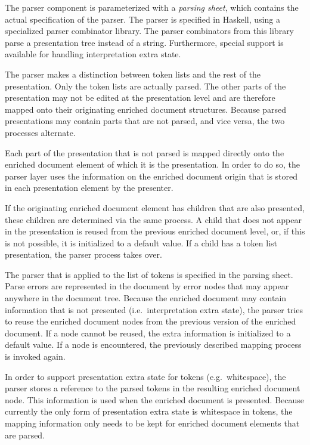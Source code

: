 The parser component is parameterized with a {\em parsing sheet}, which contains the actual specification of the parser. The parser is specified in Haskell, using a specialized parser combinator library. The parser combinators from this library parse a presentation tree instead of a string. Furthermore, special support is available for handling interpretation extra state.

The parser makes a distinction between token lists and the rest of the presentation. Only the token lists are actually parsed. The other parts of the presentation may not be edited at the presentation level and are therefore mapped onto their originating enriched document structures. Because parsed presentations may contain parts that are not parsed, and vice versa, the two processes alternate.

Each part of the presentation that is not parsed is mapped directly onto the enriched document element of which it is the presentation. In order to do so, the parser layer uses the information on the enriched document origin that is stored in each presentation element by the presenter.

If the originating enriched document element has children that are also presented, these children are determined via the same process. A child that does not appear in the presentation is reused from the previous enriched document level, or, if this is not possible, it is initialized to a default value. If a child has a token list presentation, the parser process takes over.

The parser that is applied to the list of tokens is specified  in the parsing sheet. Parse errors are represented in the document by error nodes that may appear anywhere in the document tree. Because the enriched document may contain information that is not presented (i.e.\ interpretation extra state), the parser tries to reuse the enriched document nodes from the previous version of the enriched document. If a node cannot be reused, the extra information is initialized to a default value. If a  node is encountered, the previously described mapping process is invoked again.

In order to support presentation extra state for tokens (e.g.\ whitespace), the parser stores a reference to the parsed tokens in the resulting enriched document node. This information is used when the enriched document is presented. Because currently the only form of presentation extra state is whitespace in tokens, the mapping information only needs to be kept for enriched document elements that are parsed.

